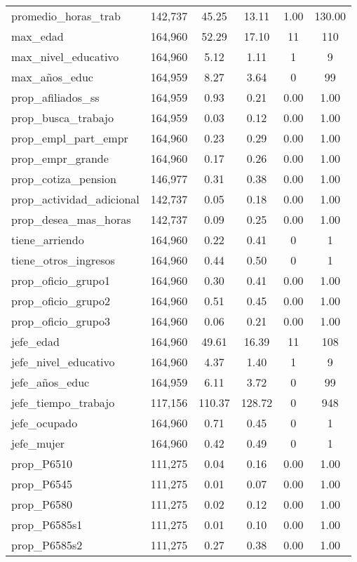 \begin{table}[!htbp]
\begin{tabular}{@{\extracolsep{5pt}}lccccc}
promedio\_horas\_trab & 142,737 & 45.25 & 13.11 & 1.00 & 130.00 \\ 
max\_edad & 164,960 & 52.29 & 17.10 & 11 & 110 \\ 
max\_nivel\_educativo & 164,960 & 5.12 & 1.11 & 1 & 9 \\ 
max\_años\_educ & 164,959 & 8.27 & 3.64 & 0 & 99 \\ 
prop\_afiliados\_ss & 164,959 & 0.93 & 0.21 & 0.00 & 1.00 \\ 
prop\_busca\_trabajo & 164,959 & 0.03 & 0.12 & 0.00 & 1.00 \\ 
prop\_empl\_part\_empr & 164,960 & 0.23 & 0.29 & 0.00 & 1.00 \\ 
prop\_empr\_grande & 164,960 & 0.17 & 0.26 & 0.00 & 1.00 \\ 
prop\_cotiza\_pension & 146,977 & 0.31 & 0.38 & 0.00 & 1.00 \\ 
prop\_actividad\_adicional & 142,737 & 0.05 & 0.18 & 0.00 & 1.00 \\ 
prop\_desea\_mas\_horas & 142,737 & 0.09 & 0.25 & 0.00 & 1.00 \\ 
tiene\_arriendo & 164,960 & 0.22 & 0.41 & 0 & 1 \\ 
tiene\_otros\_ingresos & 164,960 & 0.44 & 0.50 & 0 & 1 \\ 
prop\_oficio\_grupo1 & 164,960 & 0.30 & 0.41 & 0.00 & 1.00 \\ 
prop\_oficio\_grupo2 & 164,960 & 0.51 & 0.45 & 0.00 & 1.00 \\ 
prop\_oficio\_grupo3 & 164,960 & 0.06 & 0.21 & 0.00 & 1.00 \\ 
jefe\_edad & 164,960 & 49.61 & 16.39 & 11 & 108 \\ 
jefe\_nivel\_educativo & 164,960 & 4.37 & 1.40 & 1 & 9 \\ 
jefe\_años\_educ & 164,959 & 6.11 & 3.72 & 0 & 99 \\ 
jefe\_tiempo\_trabajo & 117,156 & 110.37 & 128.72 & 0 & 948 \\ 
jefe\_ocupado & 164,960 & 0.71 & 0.45 & 0 & 1 \\ 
jefe\_mujer & 164,960 & 0.42 & 0.49 & 0 & 1 \\ 
prop\_P6510 & 111,275 & 0.04 & 0.16 & 0.00 & 1.00 \\ 
prop\_P6545 & 111,275 & 0.01 & 0.07 & 0.00 & 1.00 \\ 
prop\_P6580 & 111,275 & 0.02 & 0.12 & 0.00 & 1.00 \\ 
prop\_P6585s1 & 111,275 & 0.01 & 0.10 & 0.00 & 1.00 \\ 
prop\_P6585s2 & 111,275 & 0.27 & 0.38 & 0.00 & 1.00 \\ 

\end{tabular}
\end{table}
